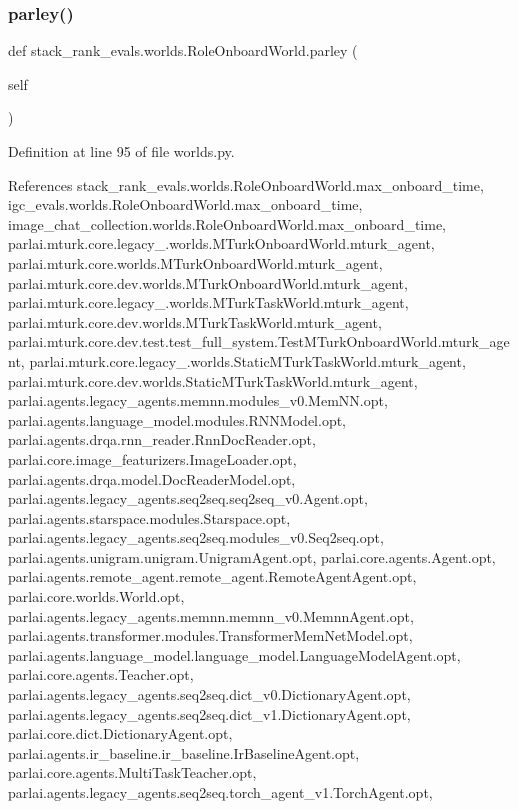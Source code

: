 \subsubsection{\texorpdfstring{parley()}{parley()}\hspace{0.1cm}{\footnotesize\ttfamily [1/2]}}
{\footnotesize\ttfamily def stack\+\_\+rank\+\_\+evals.\+worlds.\+Role\+Onboard\+World.\+parley (\begin{DoxyParamCaption}\item[{}]{self }\end{DoxyParamCaption})}



Definition at line 95 of file worlds.\+py.



References stack\+\_\+rank\+\_\+evals.\+worlds.\+Role\+Onboard\+World.\+max\+\_\+onboard\+\_\+time, igc\+\_\+evals.\+worlds.\+Role\+Onboard\+World.\+max\+\_\+onboard\+\_\+time, image\+\_\+chat\+\_\+collection.\+worlds.\+Role\+Onboard\+World.\+max\+\_\+onboard\+\_\+time, parlai.\+mturk.\+core.\+legacy\+\_.\+worlds.\+M\+Turk\+Onboard\+World.\+mturk\+\_\+agent, parlai.\+mturk.\+core.\+worlds.\+M\+Turk\+Onboard\+World.\+mturk\+\_\+agent, parlai.\+mturk.\+core.\+dev.\+worlds.\+M\+Turk\+Onboard\+World.\+mturk\+\_\+agent, parlai.\+mturk.\+core.\+legacy\+\_.\+worlds.\+M\+Turk\+Task\+World.\+mturk\+\_\+agent, parlai.\+mturk.\+core.\+dev.\+worlds.\+M\+Turk\+Task\+World.\+mturk\+\_\+agent, parlai.\+mturk.\+core.\+dev.\+test.\+test\+\_\+full\+\_\+system.\+Test\+M\+Turk\+Onboard\+World.\+mturk\+\_\+agent, parlai.\+mturk.\+core.\+legacy\+\_.\+worlds.\+Static\+M\+Turk\+Task\+World.\+mturk\+\_\+agent, parlai.\+mturk.\+core.\+dev.\+worlds.\+Static\+M\+Turk\+Task\+World.\+mturk\+\_\+agent, parlai.\+agents.\+legacy\+\_\+agents.\+memnn.\+modules\+\_\+v0.\+Mem\+N\+N.\+opt, parlai.\+agents.\+language\+\_\+model.\+modules.\+R\+N\+N\+Model.\+opt, parlai.\+agents.\+drqa.\+rnn\+\_\+reader.\+Rnn\+Doc\+Reader.\+opt, parlai.\+core.\+image\+\_\+featurizers.\+Image\+Loader.\+opt, parlai.\+agents.\+drqa.\+model.\+Doc\+Reader\+Model.\+opt, parlai.\+agents.\+legacy\+\_\+agents.\+seq2seq.\+seq2seq\+\_\+v0.\+Agent.\+opt, parlai.\+agents.\+starspace.\+modules.\+Starspace.\+opt, parlai.\+agents.\+legacy\+\_\+agents.\+seq2seq.\+modules\+\_\+v0.\+Seq2seq.\+opt, parlai.\+agents.\+unigram.\+unigram.\+Unigram\+Agent.\+opt, parlai.\+core.\+agents.\+Agent.\+opt, parlai.\+agents.\+remote\+\_\+agent.\+remote\+\_\+agent.\+Remote\+Agent\+Agent.\+opt, parlai.\+core.\+worlds.\+World.\+opt, parlai.\+agents.\+legacy\+\_\+agents.\+memnn.\+memnn\+\_\+v0.\+Memnn\+Agent.\+opt, parlai.\+agents.\+transformer.\+modules.\+Transformer\+Mem\+Net\+Model.\+opt, parlai.\+agents.\+language\+\_\+model.\+language\+\_\+model.\+Language\+Model\+Agent.\+opt, parlai.\+core.\+agents.\+Teacher.\+opt, parlai.\+agents.\+legacy\+\_\+agents.\+seq2seq.\+dict\+\_\+v0.\+Dictionary\+Agent.\+opt, parlai.\+agents.\+legacy\+\_\+agents.\+seq2seq.\+dict\+\_\+v1.\+Dictionary\+Agent.\+opt, parlai.\+core.\+dict.\+Dictionary\+Agent.\+opt, parlai.\+agents.\+ir\+\_\+baseline.\+ir\+\_\+baseline.\+Ir\+Baseline\+Agent.\+opt, parlai.\+core.\+agents.\+Multi\+Task\+Teacher.\+opt, parlai.\+agents.\+legacy\+\_\+agents.\+seq2seq.\+torch\+\_\+agent\+\_\+v1.\+Torch\+Agent.\+opt, 